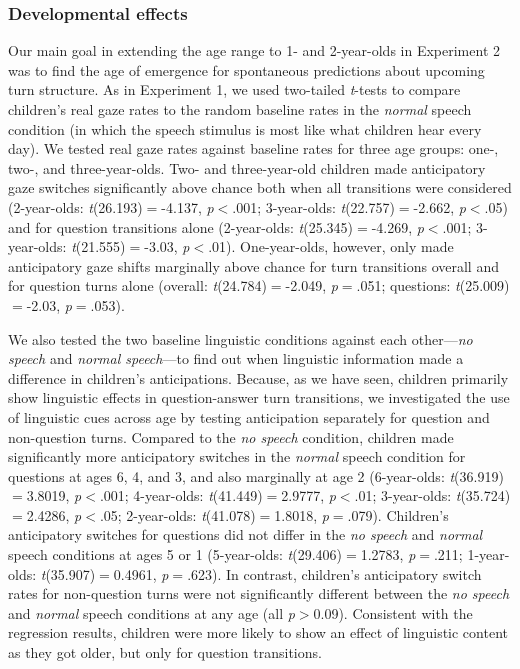 \documentclass[authoryear, 12pt]{elsarticle}
\begin{document}
\subsubsection*{Developmental effects}

Our main goal in extending the age range to 1- and 2-year-olds in Experiment 2 was to find the age of emergence for spontaneous predictions about upcoming turn structure. As in Experiment 1, we used two-tailed \textit{t}-tests to compare children's real gaze rates to the random baseline rates in the \textit{normal} speech condition (in which the speech stimulus is most like what children hear every day). We tested real gaze rates against baseline rates for three age groups: one-, two-, and three-year-olds. Two- and three-year-old children made anticipatory gaze switches significantly above chance both when all transitions were considered (2-year-olds: \textit{t}(26.193)$=$-4.137, \textit{p}$<$.001; 3-year-olds: \textit{t}(22.757)$=$-2.662, \textit{p}$<$.05) and for question transitions alone (2-year-olds: \textit{t}(25.345)$=$-4.269, \textit{p}$<$.001; 3-year-olds: \textit{t}(21.555)$=$-3.03, \textit{p}$<$.01). One-year-olds, however, only made anticipatory gaze shifts marginally above chance for turn transitions overall and for question turns alone (overall: \textit{t}(24.784)$=$-2.049, \textit{p}$=$.051; questions: \textit{t}(25.009)$=$-2.03, \textit{p}$=$.053).

We also tested the two baseline linguistic conditions against each other---\textit{no speech} and \textit{normal speech}---to find out when linguistic information made a difference in children's anticipations. Because, as we have seen, children primarily show linguistic effects in question-answer turn transitions, we investigated the use of linguistic cues across age by testing anticipation separately for question and non-question turns. Compared to the \textit{no speech} condition, children made significantly more anticipatory switches in the \textit{normal} speech condition for questions at ages 6, 4, and 3, and also marginally at age 2 (6-year-olds: \textit{t}(36.919)$=$3.8019, \textit{p}$<$.001; 4-year-olds: \textit{t}(41.449)$=$2.9777, \textit{p}$<$.01; 3-year-olds: \textit{t}(35.724)$=$2.4286, \textit{p}$<$.05; 2-year-olds: \textit{t}(41.078)$=$1.8018, \textit{p}$=$.079). Children's anticipatory switches for questions did not differ in the \textit{no speech} and \textit{normal} speech conditions at ages 5 or 1 (5-year-olds: \textit{t}(29.406)$=$1.2783, \textit{p}$=$.211; 1-year-olds: \textit{t}(35.907)$=$0.4961, \textit{p}$=$.623). In contrast, children's anticipatory switch rates for non-question turns were not significantly different between the \textit{no speech} and \textit{normal} speech conditions at any age (all \textit{p}$>$0.09). Consistent with the regression results, children were more likely to show an effect of linguistic content as they got older, but only for question transitions.
\end{document}
